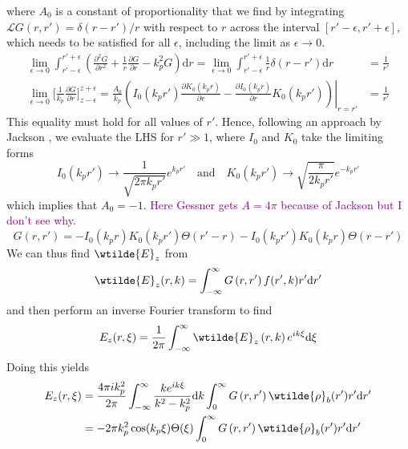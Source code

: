 where $A_0$ is a constant of proportionality that we find by integrating $\mathscr{L}G(r,r')=\delta(r-r')/r$ with respect to $r$ across the interval $\left[r'-\epsilon, r'+\epsilon \right]$, which needs to be satisfied for all $\epsilon$, including the limit as $\epsilon\to 0$.
\begin{align}
 \lim_{\epsilon\to 0}\int_{r'-\epsilon}^{r'+\epsilon}\left(\frac{\partial^2 G}{\partial r^2}+\frac{1}{r}\frac{\partial G}{\partial r} -k^2_pG\right)\mathrm{d}r= \lim_{\epsilon\to 0}\int_{r'-\epsilon}^{r'+\epsilon}\frac{1}{r}\delta(r-r')\mathrm{d}r&=\frac{1}{r'}\\
 \lim_{\epsilon\to 0}\Big[\frac{1}{k_p}\frac{\partial G}{\partial r} \Big]_{z-\epsilon}^{z+\epsilon}=\frac{A_0}{k_p} \left.\left(I_0(k_pr')\frac{\partial K_0(k_pr)}{\partial r}-\frac{\partial I_0(k_pr)}{\partial r}K_0(k_pr')\right)\right|_{r=r'} &=\frac{1}{r'}
\end{align}
This equality must hold for all values of $r'$. Hence, following an approach by Jackson \citep{Jackson1962}, we evaluate the LHS for $r'\gg 1$, where $I_0$ and $K_0$ take the limiting forms 
\begin{equation}
I_0(k_pr')\to \frac{1}{\sqrt{2\pi k_pr'}}e^{k_pr'} \quad \text{and} \quad K_0(k_pr')\to \sqrt{\frac{\pi}{2k_pr'}}e^{-k_pr'}
\end{equation}
which implies that $A_0=-1$. \textcolor{purple}{Here Gessner gets $A=4\pi$ because of Jackson but I don't see why.} 
\begin{equation}
G\left(r,r'\right)=- I_0(k_pr)K_0(k_pr')\Theta(r'-r)-I_0(k_pr')K_0(k_pr)\Theta(r-r')
\end{equation}
We can thus find $\wtilde{E}_z$ from 
\begin{equation}
\wtilde{E}_z(r,k)=\int_{-\infty}^{\infty}G\left(r,r'\right)f(r',k)r'\mathrm{d}r'
\end{equation}
and then perform an inverse Fourier transform to find 
\begin{equation}
E_z(r,\xi)=\frac{1}{2\pi}\int_ {-\infty}^{\infty}\wtilde{E}_z\left(r,k\right)e^{ik\xi}\mathrm{d}\xi
\end{equation}
Doing this yields 
\begin{align}
E_z(r,\xi)&=\frac{4\pi ik_p^2}{2\pi}\int_{-\infty}^{\infty}\frac{ke^{ik\xi}}{k^2-k_p^2}\mathrm{d}k\int_0^{\infty}G\left(r,r'\right)\wtilde{\rho}_b(r')r'\mathrm{d}r'\\
&=-2\pi k_p^2\cos(k_p\xi)\Theta(\xi)\int_0^{\infty}G\left(r,r'\right)\wtilde{\rho}_b(r')r'\mathrm{d}r'
\end{align}
